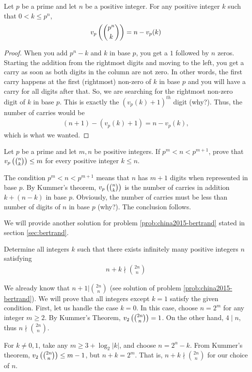 \begin{corollary}\label{cor:kummer-corollary}
Let $p$ be a prime and let $n$ be a positive integer. For any positive integer $k$ such that $0<k\leq p^n$,
\begin{align*}
	v_{p}\left(\binom{p^n}{k}\right)	= n - v_p(k)
\end{align*}
\end{corollary}

\begin{proof}
When you add $p^n - k$ and $k$ in base $p$, you get a $1$ followed by $n$ zeros. Starting the addition from the rightmost digits and moving to the left, you get a carry as soon as both digits in the column are not zero. In other words, the first carry happens at the first (rightmost) non-zero of $k$ in base $p$ and you will have a carry for all digits after that. So, we are searching for the rightmost non-zero digit of $k$ in base $p$. This is exactly the $(v_p(k)+1)^{th}$ digit (why?). Thus, the number of carries would be
\begin{align*}
	(n+1)-(v_p(k)+1) = n-v_p(k),
\end{align*}
which is what we wanted.
\end{proof}
\begin{problem}
Let $p$ be a prime and let $m,n$ be positive integers. If $p^m < n < p^{m+1}$, prove that $v_{p}\left(\binom{n}{k}\right) \leq m$ for every positive integer $k\leq n$.
\end{problem}

\begin{solution}
The condition $p^m < n < p^{m+1}$ means that $n$ has $m+1$ digits when represented in base $p$. By Kummer's theorem, $v_{p}\left(\binom{n}{k}\right)$ is the number of carries in addition $k+(n-k)$ in base $p$. Obviously, the number of carries must be less than number of digits of $n$ in base $p$ (why?). The conclusion follows.
\end{solution}
We will provide another solution for problem \ref{prob:china2015-bertrand} stated in section \ref{sec:bertrand}.

\begin{problem}[China 2015]
Determine all integers $k$ such that there exists infinitely many positive integers $n$ satisfying
\begin{align*}
	n+k \nmid \binom{2n}{n}
\end{align*}
\end{problem}

\begin{solution}
We already know that $n+1 \big| \binom{2n}{n}$ (see solution of problem \ref{prob:china2015-bertrand}). We will prove that all integers except $k=1$ satisfy the given condition. First, let us handle the case $k=0$. In this case, choose $n=2^m$ for any integer $m\geq 2$. By Kummer's Theorem, $v_{2}\left(\binom{2n}{n}\right)=1$. On the other hand, $4\mid n$, thus $	n \nmid\binom{2n}{n}$.

For $k \ne 0,1$, take any $m \geq 3 + {\log _2}\left| k \right|$, and choose $n = {2^\alpha } - k$. From Kummer's theorem, $v_{2}\left(\binom{2n}{n}\right) \leq m - 1$, but $n + k = {2^m}$. That is, $n+k \nmid\binom{2n}{n}$ for our choice of $n$.
\end{solution}

